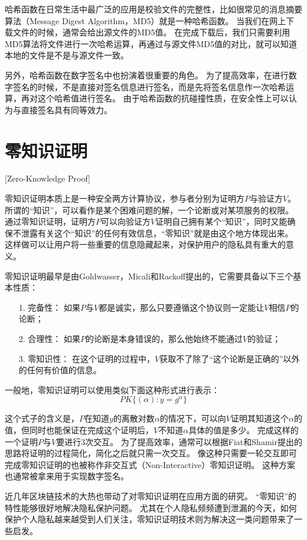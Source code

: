 哈希函数在日常生活中最广泛的应用是校验文件的完整性，比如很常见的消息摘要算法（Message Digest Algorithm，MD5）就是一种哈希函数。
当我们在网上下载文件的时候，通常会给出源文件的MD5值。
在完成下载后，我们只需要利用MD5算法将文件进行一次哈希运算，再通过与源文件MD5值的对比，就可以知道本地的文件是不是与源文件一致。

另外，哈希函数在数字签名中也扮演着很重要的角色。
为了提高效率，在进行数字签名的时候，不是直接对签名信息进行签名，而是先将签名信息作一次哈希运算，再对这个哈希值进行签名。
由于哈希函数的抗碰撞性质，在安全性上可以认为与直接签名具有同等效力。

\section{零知识证明}[Zero-Knowledge Proof]

零知识证明本质上是一种安全两方计算协议，参与者分别为证明方$P$与验证方$V$。
所谓的“知识”，可以看作是某个困难问题的解，一个论断或对某项服务的权限。
通过零知识证明，证明方$P$可以向验证方$V$证明自己拥有某个“知识”，同时又能确保不泄露有关这个“知识”的任何有效信息，“零知识”就是由这个地方体现出来。
这样做可以让用户将一些重要的信息隐藏起来，对保护用户的隐私具有重大的意义。

零知识证明最早是由Goldwasser，Micali和Rackoff提出的\cite{goldwasser1989knowledge}，它需要具备以下三个基本性质：
\begin{itemize}
  \item[1.] 完备性： 如果$P$与$V$都是诚实，那么只要遵循这个协议则一定能让$V$相信$P$的论断；
  \item[2.] 合理性： 如果$P$的论断是本身错误的，那么他始终不能通过$V$的验证；
  \item[3.] 零知识性： 在这个证明的过程中，$V$获取不了除了“这个论断是正确的”以外的任何有价值的信息。
\end{itemize}

一般地，零知识证明可以使用类似下面这种形式进行表示\cite{camenisch1997efficient}：
$$PK\{(\alpha):y=g^\alpha\}$$

这个式子的含义是，$P$在知道$y$的离散对数$\alpha$的情况下，可以向$V$证明其知道这个$\alpha$的值，但同时也能保证在完成这个证明后，$V$不知道$\alpha$具体的值是多少。
完成这样的一个证明$P$与$V$要进行3次交互。
为了提高效率，通常可以根据Fiat和Shamir提出的思路\cite{fiat1986prove}将证明的过程简化，简化之后就只需一次交互。
像这种只需要一轮交互即可完成零知识证明的也被称作非交互式（Non-Interactive）零知识证明。
这种方案也通常被拿来用于实现数字签名。

近几年区块链技术的大热也带动了对零知识证明在应用方面的研究。
“零知识”的特性能够很好地解决隐私保护问题。
尤其在个人隐私频频遭到泄漏的今天，如何保护个人隐私越来越受到人们关注，零知识证明技术则为解决这一类问题带来了一些启发。

